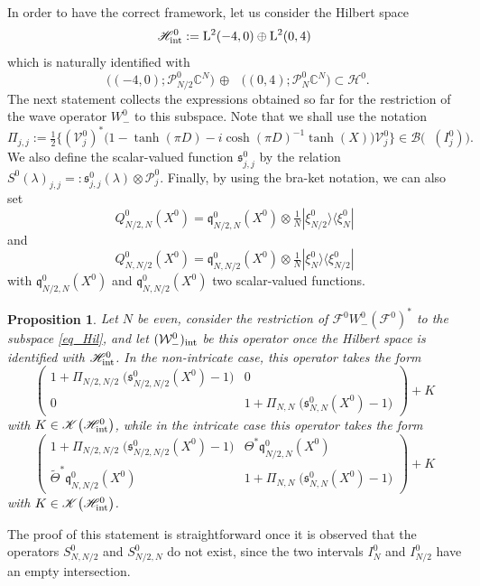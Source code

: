 \documentclass[11pt]{article}
\def\B{\mathscr B}
\def\C{\mathbb C}
\def\F{\mathscr F}
\def\Hrond{\mathscr H}
\def\K{\mathscr K}
\def\P{\mathcal P}
\def\s{\mathfrak s}
\def\V{\mathcal V}
\def\W{\mathcal W}
\def\ltwo{\mathop{\mathrm{L}^2}\nolimits}
\def\q{\mathfrak{q}}
\newtheorem{Proposition}[Theorem]{Proposition}
\begin{document}
In order to have the correct framework, let us consider
the Hilbert space
\begin{equation}\label{eq_def_int}
\Hrond^0_{\rm int}:=\ltwo(-4,0) \oplus  \ltwo(0,4)
\end{equation}
which is naturally identified with 
\begin{equation}\label{eq_Hil}
\ltwo\big((-4,0);\P^0_{N/2} \C^N\big) \, \oplus  \, \ltwo\big((0,4);\P^0_N \C^N\big)
\subset \Hrond^0.
\end{equation}
The next statement collects the expressions obtained so far
for the restriction of the wave operator $W_-^0$ to this subspace. 
Note that we shall use the notation
$$
 \Pi_{j,j}:=\tfrac12\big\{(\V^{0}_j)^*\big(1-\tanh(\pi D)-i\cosh(\pi D)^{-1}\tanh(X)\big)
\V^0_j \big\} \in \B\big(\ltwo(I^0_j)\big).
$$
We also define the scalar-valued function $\s_{j,j}^0$ by the relation 
$S^0(\lambda)_{j,j}=:\s_{j,j}^0(\lambda)\otimes \P_j^0$. 
Finally, by using the bra-ket notation, we can also set
$$
Q^0_{N/2,N}(X^0) =\q^0_{N/2,N}(X^0) \otimes \tfrac{1}{N}|\xi^0_{N/2}\rangle\langle \xi^0_N | 
$$
and 
$$
Q^0_{N,N/2}(X^0) = \q^0_{N,N/2}(X^0)  \otimes \tfrac{1}{N}|\xi^0_{N}\rangle\langle \xi^0_{N/2} |
$$
with $\q^0_{N/2,N}(X^0)$ and $\q^0_{N,N/2}(X^0)$ two scalar-valued functions.

\begin{Proposition}\label{prop_restriction}
Let $N$ be even, consider the restriction of $\F^0 W^0_-(\F^0)^*$
to the subspace \eqref{eq_Hil}, and let $(\W_-^0)_{\rm int}$ 
be this operator once the Hilbert space is identified with $\Hrond^0_{\rm int}$.
In the non-intricate case, this operator
takes the form
$$
\left(\begin{matrix}
1+ \Pi_{N/2,N/2}\;\!\big(\s^0_{N/2,N/2}(X^0)-1\big) & 0 \\
0 & 1+ \Pi_{N,N}\;\!\big(\s^0_{N,N}(X^0)-1\big)
\end{matrix}\right)
+ K
$$
with $K \in \K\big(\Hrond^0_{\rm int}\big)$, 
while in the intricate case this operator takes the form
$$
\left(\begin{matrix}1+ \Pi_{N/2,N/2}\;\!\big(\s^0_{N/2,N/2}(X^0)-1\big)
& \Theta^* \q^0_{N/2,N}(X^0) \\
\tilde \Theta^* \q^0_{N,N/2}(X^0) & 1+ \Pi_{N,N}\;\!\big(\s^0_{N,N}(X^0)-1\big)
\end{matrix}\right)
+K
$$
with $K\in \K\big(\Hrond^0_{\rm int}\big)$.
\end{Proposition}

The proof of this statement is straightforward once it is observed
that the operators $S^0_{N,N/2}$ and $S^0_{N/2,N}$ do not exist, since the
two intervals $I^0_{N}$ and $I^0_{N/2}$ have an empty intersection.
\end{document}
